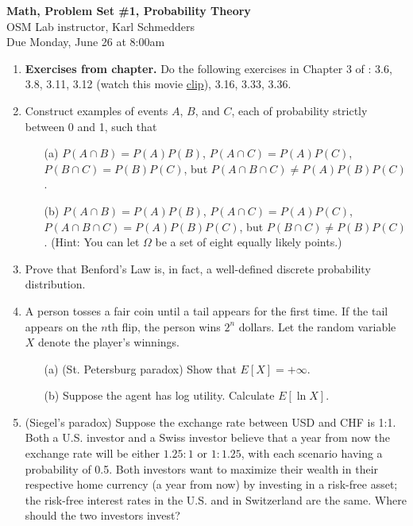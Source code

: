 \documentclass[letterpaper,12pt]{article}
\theoremstyle{definition}
\begin{document}
\begin{flushleft}
   \textbf{\large{Math, Problem Set \#1, Probability Theory}} \\[5pt]
   OSM Lab instructor, Karl Schmedders \\[5pt]
   Due Monday, June 26 at 8:00am
\end{flushleft}

\vspace{5mm}

\begin{enumerate}
	\item {\bf Exercises from chapter.} Do the following exercises in Chapter 3 of \citet{HJ17}: 3.6, 3.8, 3.11, 3.12 (watch this movie \href{https://www.youtube.com/watch?v=Zr_xWfThjJ0}{clip}), 3.16, 3.33, 3.36.
	\item Construct examples of events $A$, $B$, and $C$, each of probability strictly between 0 and 1, such that
   		\begin{itemize}
			\item[(a)] $P(A  \cap B) = P(A)P(B)$, $P(A  \cap C) = P(A)P(C)$, $P(B  \cap C) = P(B)P(C)$, but $P(A  \cap B \cap C) \neq P(A)P(B)P(C)$.
			\item[(b)] $P(A  \cap B) = P(A)P(B)$, $P(A  \cap C) = P(A)P(C)$, $P(A  \cap B \cap C) = P(A)P(B)P(C)$, but $P(B  \cap C) \neq P(B)P(C)$. (Hint: You can let $\Omega$ be a set of eight equally likely points.)
		\end{itemize}
   	\item Prove that Benford's Law is, in fact, a well-defined discrete probability distribution.
   	\item A person tosses a fair coin until a tail appears for the first time. If the tail appears on the $n$th flip, the person wins $2^n$ dollars. Let the random variable $X$ denote the player's winnings.
		\begin{itemize}
			\item[(a)] (St. Petersburg paradox) Show that $E[X]= + \infty$.
			\item[(b)] Suppose the agent has log utility. Calculate $E[\ln X]$.
		\end{itemize}
	\item (Siegel's paradox) Suppose the exchange rate between USD and CHF is 1:1. Both a U.S. investor and a Swiss investor believe that a year from now the exchange rate will be either $1.25:1$ or $1:1.25$, with each scenario having a probability of 0.5. Both investors want to maximize their wealth in their respective home currency (a year from now) by investing in a risk-free asset; the risk-free interest rates in the U.S. and in Switzerland are the same. Where should the two investors invest?


\end{enumerate}
\end{document}
